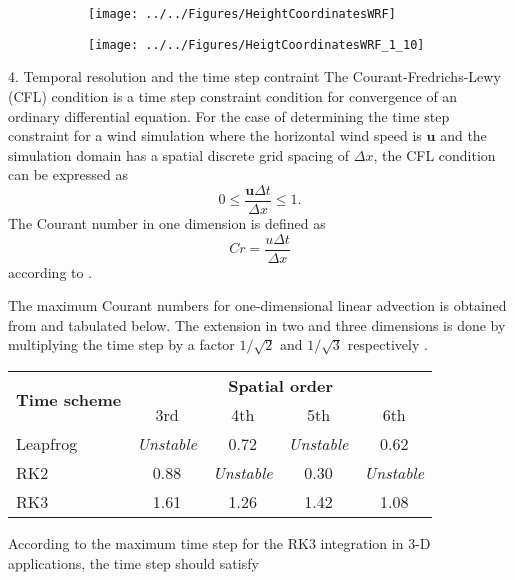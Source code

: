 \documentclass{beamer}
\newcommand{\ub}{\bm {u}\xspace}						%
\begin{document}
\begin{frame}
\begin{figure}[htp]
	\centering
	\begin{subfigure}{0.49\textwidth} 
		\centering
		\texttt{[image: ../../Figures/HeightCoordinatesWRF]}
	\end{subfigure}
	\begin{subfigure}{0.49\textwidth}
		\centering
		\texttt{[image: ../../Figures/HeigtCoordinatesWRF\_1\_10]}
	\end{subfigure}
\end{figure}
\end{frame}


\begin{frame}[fragile,allowframebreaks=1, t]{4. Temporal resolution and the time step contraint}
The Courant-Fredrichs-Lewy (CFL) condition is a time step constraint condition for convergence of an ordinary differential equation. 
For the case of determining the time step constraint for a wind simulation where the horizontal wind speed is $\ub$ and the simulation domain has a spatial discrete grid spacing of $\Delta x$, the CFL condition can be expressed as 
\begin{equation}
0 \leq \frac{\ub\Delta t}{\Delta x} \leq 1.
\label{CFLcondition}
\end{equation}
The Courant number in one dimension is defined as 
\begin{equation}
Cr = \frac{u\Delta t}{\Delta x}
\end{equation}
according to \citet{skamarock2008description}.

The maximum Courant numbers for one-dimensional linear advection is obtained from \citet{wicker2002time} and tabulated below. The extension in two and three dimensions is done by multiplying the time step by a factor $1/\sqrt{2}$ and $1/\sqrt{3}$ respectively \citep{wicker2002time}.

\begin{table}[htp]
\centering
\begin{tabular}{ p{4 cm} | c | c | c | c}
	\hline
	\multirow{2}{*}{\textbf{Time scheme}} 	& \multicolumn{4}{c}{\textbf{Spatial order}}\\
	& 3rd	& 4th	 	& 5th 	& 6th \\
	\hline
	Leapfrog 	& \textit{Unstable}	& 0.72			& \textit{Unstable}	& 0.62\\
	RK2 		& 0.88			& \textit{Unstable}	& 0.30 			& \textit{Unstable}\\
	RK3 		& 1.61 			& 1.26			& 1.42			& 1.08\\
	\hline
\end{tabular}
\end{table}
According to %
the maximum time step for the RK3 integration in 3-D applications, the time step should satisfy


\end{frame}
\end{document}
